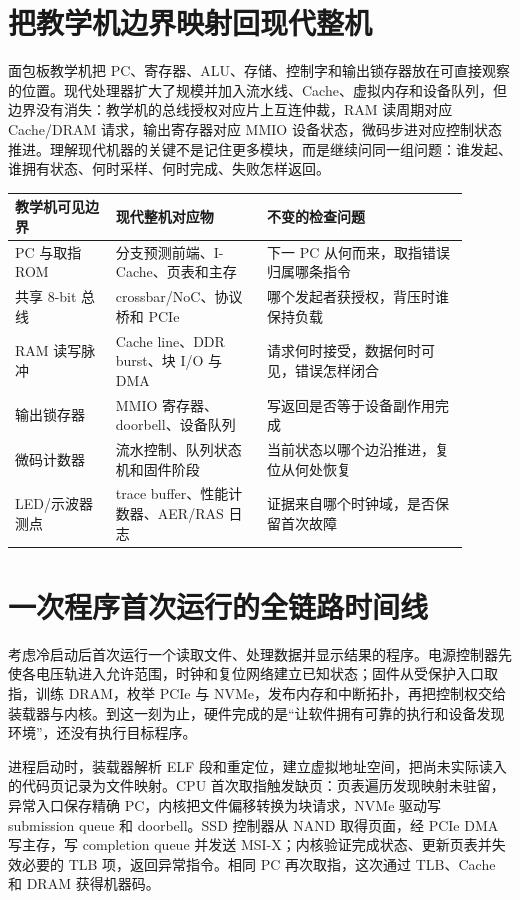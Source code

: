 \section{把教学机边界映射回现代整机}

面包板教学机把 PC、寄存器、ALU、存储、控制字和输出锁存器放在可直接观察的位置。现代处理器扩大了规模并加入流水线、Cache、虚拟内存和设备队列，但边界没有消失：教学机的总线授权对应片上互连仲裁，RAM 读周期对应 Cache/DRAM 请求，输出寄存器对应 MMIO 设备状态，微码步进对应控制状态推进。理解现代机器的关键不是记住更多模块，而是继续问同一组问题：谁发起、谁拥有状态、何时采样、何时完成、失败怎样返回。

\begin{longtable}{L{0.20\linewidth}L{0.30\linewidth}L{0.40\linewidth}}
\toprule
教学机可见边界 & 现代整机对应物 & 不变的检查问题 \\
\midrule
PC 与取指 ROM & 分支预测前端、I-Cache、页表和主存 & 下一 PC 从何而来，取指错误归属哪条指令 \\
共享 8-bit 总线 & crossbar/NoC、协议桥和 PCIe & 哪个发起者获授权，背压时谁保持负载 \\
RAM 读写脉冲 & Cache line、DDR burst、块 I/O 与 DMA & 请求何时接受，数据何时可见，错误怎样闭合 \\
输出锁存器 & MMIO 寄存器、doorbell、设备队列 & 写返回是否等于设备副作用完成 \\
微码计数器 & 流水控制、队列状态机和固件阶段 & 当前状态以哪个边沿推进，复位从何处恢复 \\
LED/示波器测点 & trace buffer、性能计数器、AER/RAS 日志 & 证据来自哪个时钟域，是否保留首次故障 \\
\bottomrule
\end{longtable}

\section{一次程序首次运行的全链路时间线}

考虑冷启动后首次运行一个读取文件、处理数据并显示结果的程序。电源控制器先使各电压轨进入允许范围，时钟和复位网络建立已知状态；固件从受保护入口取指，训练 DRAM，枚举 PCIe 与 NVMe，发布内存和中断拓扑，再把控制权交给装载器与内核。到这一刻为止，硬件完成的是“让软件拥有可靠的执行和设备发现环境”，还没有执行目标程序。

进程启动时，装载器解析 ELF 段和重定位，建立虚拟地址空间，把尚未实际读入的代码页记录为文件映射。CPU 首次取指触发缺页：页表遍历发现映射未驻留，异常入口保存精确 PC，内核把文件偏移转换为块请求，NVMe 驱动写 submission queue 和 doorbell。SSD 控制器从 NAND 取得页面，经 PCIe DMA 写主存，写 completion queue 并发送 MSI-X；内核验证完成状态、更新页表并失效必要的 TLB 项，返回异常指令。相同 PC 再次取指，这次通过 TLB、Cache 和 DRAM 获得机器码。

